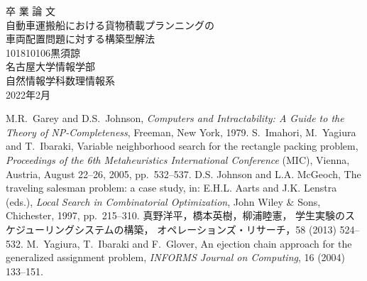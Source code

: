 \documentclass[uplatex]{ujreport}
\begin{document}
\begin{table}[b]
\begin{center}
{\huge 卒\hspace{0.1cm} 業\hspace{0.1cm} 論\hspace{0.1cm} 文}\\[2.5cm]
{\huge 自動車運搬船における貨物積載プランニングの\\車両配置問題に対する構築型解法}\\[6cm]
{\huge 101810106\qquad 黒須諒}\\[1cm]
{\huge 名古屋大学情報学部}\\[0.5cm]
{\huge 自然情報学科数理情報系}\\[0.5cm]
{\huge 2022年2月}\\
\end{center}
\end{table} 


\thispagestyle{empty} 
\clearpage
\newpage
{}
\setcounter{page}{1}







\thispagestyle{empty} 
\tableofcontents
\newpage
\setcounter{page}{1}
\pagestyle{plain}















\begin{thebibliography}{99}
  M.R.~Garey and D.S.~Johnson,
	 {\it Computers and Intractability: A Guide to the Theory of NP-Completeness},
	 Freeman, New York, 1979.
  S.~Imahori, M.~Yagiura and T.~Ibaraki,
	 Variable neighborhood search for the rectangle packing problem,
         {\it Proceedings of the 6th Metaheuristics International Conference} (MIC),
	 Vienna, Austria, August 22--26, 2005, pp.~532--537.
  D.S. Johnson and L.A. McGeoch,
	 The traveling salesman problem: a case study,
	 in: E.H.L. Aarts and J.K. Lenstra (eds.),
	 {\it Local Search in Combinatorial Optimization},
	 John Wiley \& Sons, Chichester, 1997, pp.~215--310.
  真野洋平，橋本英樹，柳浦睦憲，
	 学生実験のスケジューリングシステムの構築，
	 オペレーションズ・リサーチ，58 (2013) 524--532.
  M.~Yagiura, T.~Ibaraki and F.~Glover, 
	 An ejection chain approach for the generalized assignment problem,
	 {\it INFORMS Journal on Computing}, 16 (2004) 133--151.
\end{thebibliography}
\end{document}
